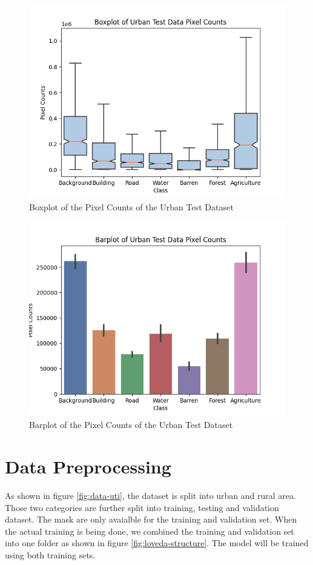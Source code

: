 \begin{figure}[!h]
\includegraphics[width=15.0cm, height=8.5cm]{images/urban test boxplot.png}
\centering
\caption{Boxplot of the Pixel Counts of the Urban Test Dataset}
\label{fig:boxplot-urban-test}
\end{figure}

\begin{figure}[!h]
\includegraphics[width=15.0cm, height=8.5cm]{images/urban test barplot.png}
\centering
\caption{Barplot of the Pixel Counts of the Urban Test Dataset}
\label{fig:barplot-urban-test}
\end{figure}

\FloatBarrier


\section{Data Preprocessing}

As shown in figure \ref{fig:data-uti}, the dataset is split into urban and rural area. Those two categories are further split into training, testing and validation dataset. The mask are only avaialble for the training and validation set. When the actual training is being done, we combined the training and validation set into one folder as shown in figure \ref{fig:loveda-structure}. The model will be trained using both training sets.

